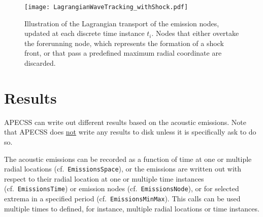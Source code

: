 \begin{figure}
    \begin{center}
    \texttt{[image: LagrangianWaveTracking\_withShock.pdf]}
    \caption{Illustration of the Lagrangian transport of the emission nodes, updated at each discrete time instance $t_i$. Nodes that either overtake the forerunning node, which represents the formation of a shock front, or that pass a predefined maximum radial coordinate are discarded.}
    \label{fig:lagrangiantrackingshock}
    \end{center}
\end{figure}


\section{Results}

APECSS can write out different results based on the acoustic emissions. Note that APECSS does \underline{not} write any results to disk unless it is specifically ask to do so.

The acoustic emissions can be recorded as a function of time at one or multiple radial locations (cf.~{\tt EmissionsSpace}), or the emissions are written out with respect to their radial location at one or multiple time instances (cf.~{\tt EmissionsTime}) or emission nodes (cf.~{\tt EmissionsNode}), or for selected extrema in a specified period (cf.~{\tt EmissionsMinMax}). This calls can be used multiple times to defined, for instance, multiple radial locations or time instances.

\vspace{0.8em}

